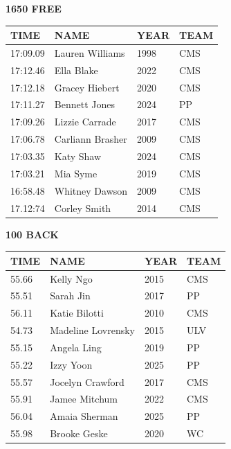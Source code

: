 \begin{table}[H]
\centering
\begin{minipage}[t]{0.48\textwidth}
\centering
\textbf{1650 FREE}\\[0.1cm]
\begin{tabular}{@{}p{1.8cm}p{2.8cm}p{1.2cm}p{1.4cm}@{}}
\hline
    \textbf{TIME} & \textbf{NAME} & \textbf{YEAR} & \textbf{TEAM} \\
\hline
    17:09.09 & Lauren Williams & 1998 & CMS \\
    17:12.46 & Ella Blake & 2022 & CMS \\
    17:12.18 & Gracey Hiebert & 2020 & CMS \\
    17:11.27 & Bennett Jones & 2024 & PP \\
    17:09.26 & Lizzie Carrade & 2017 & CMS \\
    17:06.78 & Carliann Brasher & 2009 & CMS \\
    17:03.35 & Katy Shaw & 2024 & CMS \\
    17:03.21 & Mia Syme & 2019 & CMS \\
    16:58.48 & Whitney Dawson & 2009 & CMS \\
    17.12:74 & Corley Smith & 2014 & CMS \\
\hline
\end{tabular}
\end{minipage}\hfill
\begin{minipage}[t]{0.48\textwidth}
\centering
\textbf{100 BACK}\\[0.1cm]
\begin{tabular}{@{}p{1.8cm}p{2.8cm}p{1.2cm}p{1.4cm}@{}}
\hline
    \textbf{TIME} & \textbf{NAME} & \textbf{YEAR} & \textbf{TEAM} \\
\hline
    55.66 & Kelly Ngo & 2015 & CMS \\
    55.51 & Sarah Jin & 2017 & PP \\
    56.11 & Katie Bilotti & 2010 & CMS \\
    54.73 & Madeline Lovrensky & 2015 & ULV \\
    55.15 & Angela Ling & 2019 & PP \\
    55.22 & Izzy Yoon & 2025 & PP \\
    55.57 & Jocelyn Crawford & 2017 & CMS \\
    55.91 & Jamee Mitchum & 2022 & CMS \\
    56.04 & Amaia Sherman & 2025 & PP \\
    55.98 & Brooke Geske & 2020 & WC \\
\hline
\end{tabular}
\end{minipage}
\end{table}

